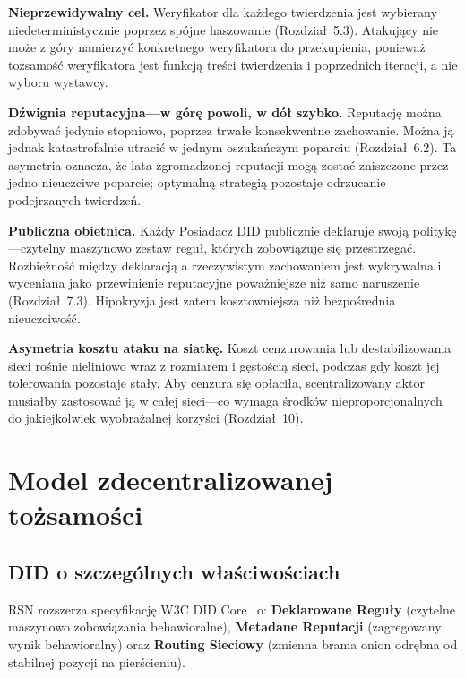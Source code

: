 \documentclass[11pt,a4paper,twocolumn]{article}
\begin{document}
\textbf{Nieprzewidywalny cel.} Weryfikator dla każdego twierdzenia jest wybierany niedeterministycznie poprzez spójne haszowanie (Rozdział~5.3). Atakujący nie może z góry namierzyć konkretnego weryfikatora do przekupienia, ponieważ tożsamość weryfikatora jest funkcją treści twierdzenia i poprzednich iteracji, a nie wyboru wystawcy.

\textbf{Dźwignia reputacyjna---w górę powoli, w dół szybko.} Reputację można zdobywać jedynie stopniowo, poprzez trwałe konsekwentne zachowanie. Można ją jednak katastrofalnie utracić w jednym oszukańczym poparciu (Rozdział~6.2). Ta asymetria oznacza, że lata zgromadzonej reputacji mogą zostać zniszczone przez jedno nieuczciwe poparcie; optymalną strategią pozostaje odrzucanie podejrzanych twierdzeń.

\textbf{Publiczna obietnica.} Każdy Posiadacz DID publicznie deklaruje swoją politykę---czytelny maszynowo zestaw reguł, których zobowiązuje się przestrzegać. Rozbieżność między deklaracją a rzeczywistym zachowaniem jest wykrywalna i wyceniana jako przewinienie reputacyjne poważniejsze niż samo naruszenie (Rozdział~7.3). Hipokryzja jest zatem kosztowniejsza niż bezpośrednia nieuczciwość.

\textbf{Asymetria kosztu ataku na siatkę.} Koszt cenzurowania lub destabilizowania sieci rośnie nieliniowo wraz z rozmiarem i gęstością sieci, podczas gdy koszt jej tolerowania pozostaje stały. Aby cenzura się opłaciła, scentralizowany aktor musiałby zastosować ją w całej sieci---co wymaga środków nieproporcjonalnych do jakiejkolwiek wyobrażalnej korzyści (Rozdział~10).

\section{Model zdecentralizowanej tożsamości}

\subsection{DID o szczególnych właściwościach}

RSN rozszerza specyfikację W3C DID Core~\cite{did2022} o: \textbf{Deklarowane Reguły} (czytelne maszynowo zobowiązania behawioralne), \textbf{Metadane Reputacji} (zagregowany wynik behawioralny) oraz \textbf{Routing Sieciowy} (zmienna brama onion odrębna od stabilnej pozycji na pierścieniu).
\end{document}
